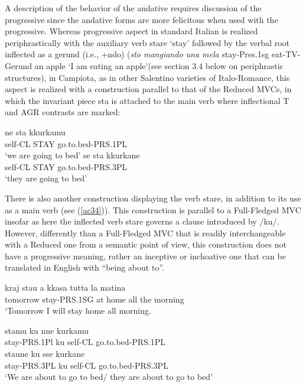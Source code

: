 \documentclass[output=paper]{langscibook}
\begin{document}
A description of the behavior of the andative requires discussion of the progressive since the andative forms are more felicitous when used with the progressive.
Whereas progressive aspect in standard Italian is realized periphrastically with the auxiliary verb stare ‘stay’ followed by the verbal root inflected as a gerund (i.e., +ndo) (\textit{sto mangiando una mela} stay-Pres.1sg eat-TV-Gerund an apple ‘I am eating an apple’(see section 3.4 below on periphrastic structures), in Campiota, as in other Salentino varieties of Italo-Romance, this aspect is realized with a construction parallel to that of the Reduced MVCs, in which the invariant piece sta is attached to the main verb where inflectional T and AGR contrasts are marked:

\ea\label{ac33}
    \ea\label{ac33a} \gll  ne   sta   kkurkamu \\ 
    self-CL  STAY   go.to.bed-PRS.1PL\\
  \glt ‘we are going to bed’
    \ex\label{ac33b} \gll se    sta   kkurkane\\
   self-CL  STAY go.to.bed-PRS.3PL\\
     \glt ‘they are going to bed’
 \z
\z

There is also another construction displaying the verb stare, in addition to its use as a main verb (see (\ref{ac34})). This construction is parallel to a Full-Fledged MVC insofar as here the inflected verb stare governs a clause introduced by /ku/. However, differently than a Full-Fledged MVC that is readily interchangeable with a Reduced one from a semantic point of view, this construction does not have a progressive meaning, rather an inceptive or inchoative one that can be translated in English with “being about to”.

\ea \label{ac34}\gll kraj      stau       a  kkasa  tutta  la  matina\\
    tomorrow   stay-PRS.1SG at home all   the  morning\\
 \glt ‘Tomorrow I will stay home all morning.
\z

\ea\label{ac35}
    \ea \label{ac35a}\gll stamu      ku  nne     kurkamu\\
    stay-PRS.1Pl ku self-CL  go.to.bed-PRS.1PL\\ 
    \ex \label{ac35b}\gll staune      ku  sse     kurkane\\
    stay-PRS.3PL ku self-CL  go.to.bed-PRS.3PL\\
    \glt ‘We are about to go to bed/ they are about to go to bed’
    \z
\z
\end{document}
